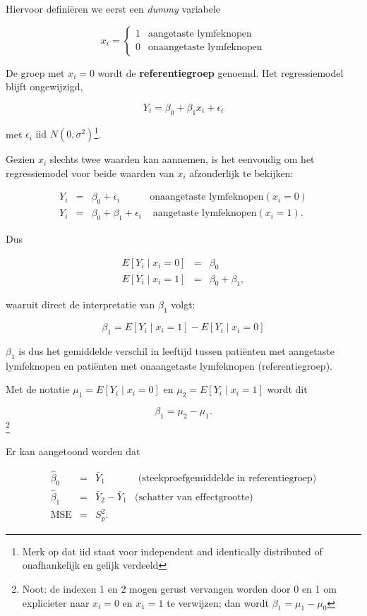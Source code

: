 \documentclass[
  12pt,dutch,coursenotes]{book}
\begin{document}
Hiervoor definiëren we eerst een \emph{dummy} variabele

\[x_i = \left\{ \begin{array}{ll}
1 & \text{aangetaste lymfeknopen} \\
0 & \text{onaangetaste lymfeknopen} \end{array}\right.\]

De groep met \(x_i=0\) wordt de \textbf{referentiegroep} genoemd.
Het regressiemodel blijft ongewijzigd,

\[Y_i = \beta_0 + \beta_1 x_i +\epsilon_i\]

met \(\epsilon_i \text{ iid } N(0,\sigma^2)\)\footnote{Merk op dat iid staat voor independent and identically distributed of onafhankelijk en gelijk verdeeld}.

Gezien \(x_i\) slechts twee waarden kan aannemen, is het eenvoudig om het regressiemodel voor beide waarden van \(x_i\) afzonderlijk te bekijken:

\[\begin{array}{lcll}
   Y_i &=& \beta_0 +\epsilon_i &\text{onaangetaste lymfeknopen} (x_i=0) \\
   Y_i &=& \beta_0 + \beta_1 +\epsilon_i &\text{ aangetaste lymfeknopen} (x_i=1) .
 \end{array}\]

Dus

\begin{eqnarray*}
   E\left[Y_i\mid x_i=0\right] &=& \beta_0 \\
   E\left[Y_i\mid x_i=1\right] &=& \beta_0 + \beta_1,
\end{eqnarray*}

waaruit direct de interpretatie van \(\beta_1\) volgt:

\[   \beta_1 = E\left[Y_i\mid x_i=1\right]-E\left[Y_i\mid x_i=0\right]\]

\(\beta_1\) is dus het gemiddelde verschil in leeftijd tussen patiënten met aangetaste lymfeknopen en patiënten met onaangetaste lymfeknopen (referentiegroep).

Met de notatie \(\mu_1= E\left[Y_i\mid x_i=0\right]\) en \(\mu_2= E\left[Y_i\mid x_i=1\right]\) wordt dit

\[\beta_1 = \mu_2-\mu_1.\]\footnote{Noot: de indexen 1 en 2 mogen gerust vervangen worden door 0 en 1 om explicieter naar \(x_i=0\) en \(x_1=1\) te verwijzen; dan wordt \(\beta_1=\mu_1-\mu_0\)}

Er kan aangetoond worden dat

\[\begin{array}{ccll}
 \hat\beta_0
   &=& \bar{Y}_1&\text{ (steekproefgemiddelde in referentiegroep)} \\
 \hat\beta_1
   &=& \bar{Y}_2-\bar{Y}_1&\text{(schatter van effectgrootte)} \\
 \text{MSE}
   &=& S_p^2 .
\end{array}\]
\end{document}
